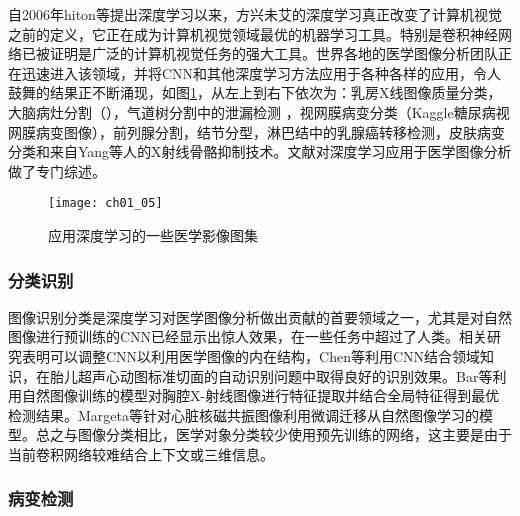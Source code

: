 自2006年hiton等\citep{Hinton2006a}提出深度学习以来，方兴未艾的深度学习真正改变了计算机视觉之前的定义，它正在成为计算机视觉领域最优的机器学习工具。特别是卷积神经网络已被证明是广泛的计算机视觉任务的强大工具。世界各地的医学图像分析团队正在迅速进入该领域，并将CNN和其他深度学习方法应用于各种各样的应用，令人鼓舞的结果正不断涌现，如图\ref{fig:ch01_05}，从左上到右下依次为：乳房X线图像质量分类\citep{Sickles2006Use}，大脑病灶分割（\citep{Abr2016Improved}），气道树分割中的泄漏检测 \citep{Charbonnier2016Improving}，视网膜病变分类（Kaggle糖尿病视网膜病变图像）\citep{Grinsven2016Fast}，前列腺分割，结节分型，淋巴结中的乳腺癌转移检测，皮肤病变分类\citep{Esteva2017Dermatologist}和来自Yang等人\citep{Yang2016Cascade}的X射线骨骼抑制技术。文献\citep{Litjens2017Asurvey,Shen2017a,Greenspan2016}对深度学习应用于医学图像分析做了专门综述。

\begin{figure}[!htbp]
    \centering
    \texttt{[image: ch01\_05]}
   \caption{应用深度学习的一些医学影像图集}
   \label{fig:ch01_05}
\end{figure}

\subsubsection{分类识别}

图像识别分类是深度学习对医学图像分析做出贡献的首要领域之一，尤其是对自然图像进行预训练的CNN已经显示出惊人效果，在一些任务中超过了人类。相关研究表明可以调整CNN以利用医学图像的内在结构，Chen等\citep{Chen2015}利用CNN结合领域知识，在胎儿超声心动图标准切面的自动识别问题中取得良好的识别效果。Bar等\citep{Bar2015Chest}利用自然图像训练的模型对胸腔X-射线图像进行特征提取并结合全局特征\citep{Oliva2001}得到最优检测结果。Margeta等\citep{Margeta2015}针对心脏核磁共振图像利用微调迁移从自然图像学习的模型。总之与图像分类相比，医学对象分类较少使用预先训练的网络，这主要是由于当前卷积网络较难结合上下文或三维信息。

\subsubsection{病变检测} 

